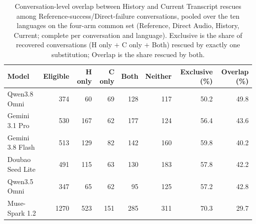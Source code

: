 \begin{table}[htbp]
\centering
\caption{Conversation-level overlap between History and Current Transcript rescues among Reference-success/Direct-failure conversations, pooled over the ten languages on the four-arm common set (Reference, Direct Audio, History, Current; complete per conversation and language). Exclusive is the share of recovered conversations (H only $+$ C only $+$ Both) rescued by exactly one substitution; Overlap is the share rescued by both.}
\label{tab:recovery_overlap}
\begingroup
\fontsize{8.5}{10.5}\selectfont
\setlength{\tabcolsep}{5pt}
\renewcommand{\arraystretch}{1.1}
\begin{tabular}{@{}lrrrrrrr@{}}
\toprule
\textbf{Model} & \textbf{Eligible} & \textbf{H only} & \textbf{C only} & \textbf{Both} & \textbf{Neither} & \textbf{Exclusive (\%)} & \textbf{Overlap (\%)} \\
\midrule
Qwen3.8 Omni & 374 & 60 & 69 & 128 & 117 & 50.2 & 49.8 \\
Gemini 3.1 Pro & 530 & 167 & 62 & 177 & 124 & 56.4 & 43.6 \\
Gemini 3.8 Flash & 513 & 129 & 82 & 142 & 160 & 59.8 & 40.2 \\
Doubao Seed Lite & 491 & 115 & 63 & 130 & 183 & 57.8 & 42.2 \\
Qwen3.5 Omni & 347 & 65 & 62 & 95 & 125 & 57.2 & 42.8 \\
Muse-Spark 1.2 & 1270 & 523 & 151 & 285 & 311 & 70.3 & 29.7 \\
\bottomrule
\end{tabular}
\endgroup
\end{table}
